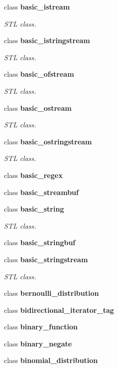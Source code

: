 \begin{DoxyCompactItemize}
class \textbf{ basic\+\_\+istream}
\begin{DoxyCompactList}\small\item\em S\+TL class. \end{DoxyCompactList}\item 
class \textbf{ basic\+\_\+istringstream}
\begin{DoxyCompactList}\small\item\em S\+TL class. \end{DoxyCompactList}\item 
class \textbf{ basic\+\_\+ofstream}
\begin{DoxyCompactList}\small\item\em S\+TL class. \end{DoxyCompactList}\item 
class \textbf{ basic\+\_\+ostream}
\begin{DoxyCompactList}\small\item\em S\+TL class. \end{DoxyCompactList}\item 
class \textbf{ basic\+\_\+ostringstream}
\begin{DoxyCompactList}\small\item\em S\+TL class. \end{DoxyCompactList}\item 
class \textbf{ basic\+\_\+regex}
\item 
class \textbf{ basic\+\_\+streambuf}
\item 
class \textbf{ basic\+\_\+string}
\begin{DoxyCompactList}\small\item\em S\+TL class. \end{DoxyCompactList}\item 
class \textbf{ basic\+\_\+stringbuf}
\item 
class \textbf{ basic\+\_\+stringstream}
\begin{DoxyCompactList}\small\item\em S\+TL class. \end{DoxyCompactList}\item 
class \textbf{ bernoulli\+\_\+distribution}
\item 
class \textbf{ bidirectional\+\_\+iterator\+\_\+tag}
\item 
class \textbf{ binary\+\_\+function}
\item 
class \textbf{ binary\+\_\+negate}
\item 
class \textbf{ binomial\+\_\+distribution}
\item 

\end{DoxyCompactItemize}
